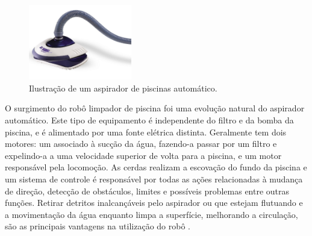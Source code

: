 \begin{figure}[h]
    \centering
    \includegraphics[width=0.4\textwidth]{figures/limpa_piscina_auto.png}
    \caption{Ilustração de um aspirador de piscinas automático. \cite{pentair2012}}
    \label{fig:schema-way-robot}
  \end{figure}

O surgimento do robô limpador de piscina foi uma evolução natural do aspirador
automático. Este tipo de equipamento é independente do filtro e da bomba da
piscina, e é alimentado por uma fonte elétrica distinta. Geralmente tem dois
motores: um associado à sucção da água, fazendo-a passar por um filtro e 
expelindo-a a uma velocidade superior de volta para a piscina, e um motor
responsável pela locomoção. As cerdas realizam a escovação do fundo da piscina
e um sistema de controle é responsável por todas as ações relacionadas à
mudança de direção, detecção de obstáculos, limites e possíveis problemas entre
outras funções. Retirar detritos inalcançáveis pelo aspirador ou que estejam flutuando
e a movimentação da água enquanto limpa a superfície, melhorando a circulação, são
as principais vantagens na utilização do robô \cite{silva2015}.
 
